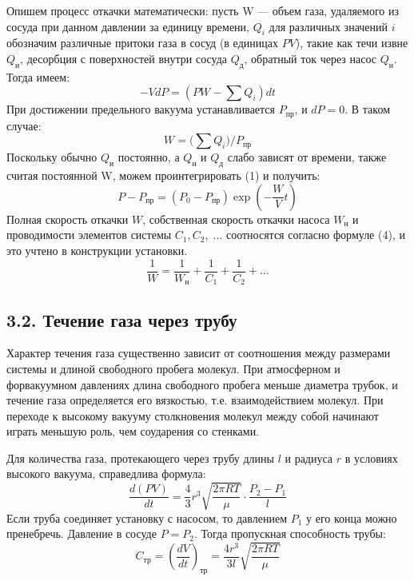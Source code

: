 \documentclass[a4paper]{article}
\begin{document}
Опишем процесс откачки математически: 
пусть W --- объем газа, удаляемого из сосуда при данном давлении за единицу времени, $Q_i$ для различных значений $i$ обозначим различные притоки газа в сосуд (в единицах $PV$), такие как течи извне $Q_\text{и}$, десорбция с поверхностей внутри сосуда $Q_\text{д}$, обратный ток через насос $Q_\text{н}$. Тогда имеем:
	\begin{equation}
		-VdP = \left(PW - \sum Q_i\right)dt
	\end{equation}
	При достижении предельного вакуума устанавливается $P_{\text{пр}}$, и $dP = 0$. В таком случае:
	\begin{equation}
		W = \biggl( \sum Q_i \biggr)\bigg/ P_{\text{пр}}
	\end{equation}
	Поскольку обычно $Q_\text{и}$ постоянно, а $Q_\text{н}$ и $Q_\text{д}$ слабо зависят от времени, также считая постоянной W, можем проинтегрировать (1) и получить:
	\begin{equation}
		P - P_{\text{пр}} = (P_0 - P_{\text{пр}})\exp\left(-\frac{W}{V}t\right)
		\label{exp}
	\end{equation}
	Полная скорость откачки $W$, собственная скорость откачки насоса $W_{\text{н}}$ и проводимости элементов системы $C_1, C_2,\;\ldots$ соотносятся согласно формуле (4), и это учтено в конструкции установки.
	\begin{equation}
		\frac{1}{W} = \frac{1}{W_\text{н}} + \frac{1}{C_1} + \frac{1}{C_2} + \ldots
	\end{equation}
	
	\subsection*{3.2. Течение газа через трубу}
	
	Характер течения газа существенно зависит от соотношения между размерами системы и длиной свободного пробега молекул. При атмосферном и форвакуумном давлениях  длина свободного пробега меньше диаметра трубок, и течение газа определяется его вязкостью, т.е. взаимодействием молекул. При переходе к высокому вакууму столкновения молекул между собой начинают играть меньшую роль, чем соударения со стенками.
	
\noindent
Для количества газа, протекающего через трубу длины $l$ и радиуса $r$ в условиях высокого вакуума, справедлива формула:
	\begin{equation}
		\frac{d(PV)}{dt} = \frac{4}{3}r^3\sqrt{\frac{2\pi RT}{\mu}}\cdot\frac{P_2 - P_1}{l}
	\end{equation}
	Если труба соединяет установку с насосом, то давлением $P_1$ у его конца можно пренебречь. Давление в сосуде $P = P_2$. Тогда пропускная способность трубы:
	\begin{equation}
		C_\text{тр} = \left(\frac{dV}{dt}\right)_\text{тр} = \frac{4r^3}{3l}\sqrt{\frac{2\pi RT}{\mu}}
		\label{ty}
	\end{equation}
\end{document}
